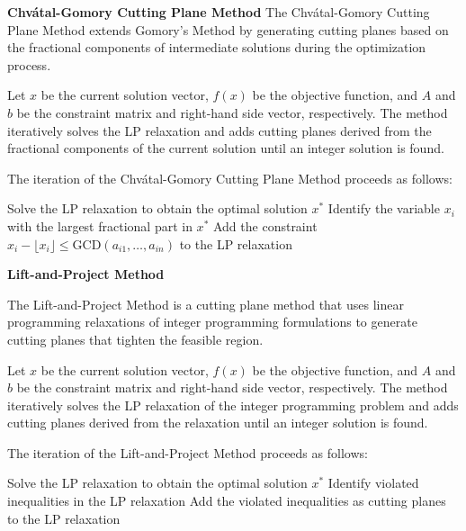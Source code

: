 \documentclass[12pt]{book} %
\begin{document}
\textbf{Chvátal-Gomory Cutting Plane Method}
\FloatBarrier
The Chvátal-Gomory Cutting Plane Method extends Gomory's Method by generating cutting planes based on the fractional components of intermediate solutions during the optimization process.

Let \(x\) be the current solution vector, \(f(x)\) be the objective function, and \(A\) and \(b\) be the constraint matrix and right-hand side vector, respectively. The method iteratively solves the LP relaxation and adds cutting planes derived from the fractional components of the current solution until an integer solution is found.

The iteration of the Chvátal-Gomory Cutting Plane Method proceeds as follows:
\FloatBarrier
\begin{algorithm}[H]
\caption{Chvátal-Gomory Cutting Plane Method}
\begin{algorithmic}[1]
\State Solve the LP relaxation to obtain the optimal solution \(x^*\)
\State Identify the variable \(x_i\) with the largest fractional part in \(x^*\)
\State Add the constraint \(x_i - \lfloor x_i \rfloor \leq \text{{GCD}}(a_{i1}, \ldots, a_{in})\) to the LP relaxation
\EndIf
\end{algorithmic}
\end{algorithm}
\FloatBarrier

\textbf{Lift-and-Project Method}

The Lift-and-Project Method is a cutting plane method that uses linear programming relaxations of integer programming formulations to generate cutting planes that tighten the feasible region.

Let \(x\) be the current solution vector, \(f(x)\) be the objective function, and \(A\) and \(b\) be the constraint matrix and right-hand side vector, respectively. The method iteratively solves the LP relaxation of the integer programming problem and adds cutting planes derived from the relaxation until an integer solution is found.

The iteration of the Lift-and-Project Method proceeds as follows:
\FloatBarrier
\begin{algorithm}[H]
\caption{Lift-and-Project Method}
\begin{algorithmic}[1]
\State Solve the LP relaxation to obtain the optimal solution \(x^*\)
\State Identify violated inequalities in the LP relaxation
\State Add the violated inequalities as cutting planes to the LP relaxation
\EndIf
\end{algorithmic}
\end{algorithm}
\end{document}
